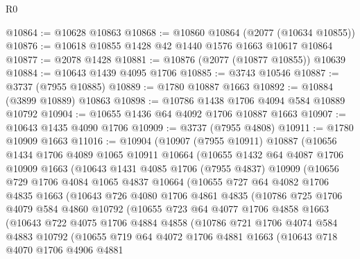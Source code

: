 \begin{lexlean}{R0}
\begin{coremodule}
@10864 := @10628 @10863
@10868 := @10860 @10864 (@2077 (@10634 @10855))
@10876 := @10618 @10855 @1428 @42 @1440 @1576 @1663 @10617 @10864
@10877 := @2078 @1428
@10881 := @10876 (@2077 (@10877 @10855)) @10639
@10884 := @10643 @1439 @4095 @1706
@10885 := @3743 @10546
@10887 := @3737 (@7955 @10885)
@10889 := @1780 @10887 @1663
@10892 := @10884 (@3899 @10889) @10863
@10898 := @10786 @1438 @1706 @4094 @584 @10889 @10792
@10904 := @10655 @1436 @64 @4092 @1706 @10887 @1663
@10907 := @10643 @1435 @4090 @1706
@10909 := @3737 (@7955 @4808)
@10911 := @1780 @10909 @1663
@11016 := @10904
    (@10907
      (@7955 @10911)
      @10887
      (@10656
        @1434
        @1706
        @4089
        @1065
        @10911
        @10664
        (@10655
          @1432
          @64
          @4087
          @1706
          @10909
          @1663
          (@10643
            @1431
            @4085
            @1706
            (@7955 @4837)
            @10909
            (@10656
              @729
              @1706
              @4084
              @1065
              @4837
              @10664
              (@10655
                @727
                @64
                @4082
                @1706
                @4835
                @1663
                (@10643
                  @726
                  @4080
                  @1706
                  @4861
                  @4835
                  (@10786
                    @725
                    @1706
                    @4079
                    @584
                    @4860
                    @10792
                    (@10655
                      @723
                      @64
                      @4077
                      @1706
                      @4858
                      @1663
                      (@10643
                        @722
                        @4075
                        @1706
                        @4884
                        @4858
                        (@10786
                          @721
                          @1706
                          @4074
                          @584
                          @4883
                          @10792
                          (@10655
                            @719
                            @64
                            @4072
                            @1706
                            @4881
                            @1663
                            (@10643
                              @718
                              @4070
                              @1706
                              @4906
                              @4881

\end{coremodule}
\end{lexlean}
